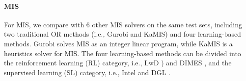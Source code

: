 \paragraph{MIS} For MIS, we compare \method{} with 6 other MIS solvers on the same test sets, including two traditional OR methods (i.e., Gurobi and KaMIS) and four learning-based methods.
Gurobi solves MIS as an integer linear program, while KaMIS is a heuristics solver for MIS.
The four learning-based methods can be divided into the reinforcement learning (RL) category, i.e., LwD \citep{ahn2020learning}) and DIMES \citep{qiudimes}, and the supervised learning (SL) category, i.e., Intel \citep{li2018combinatorial} and DGL \citep{other2022whats}.




